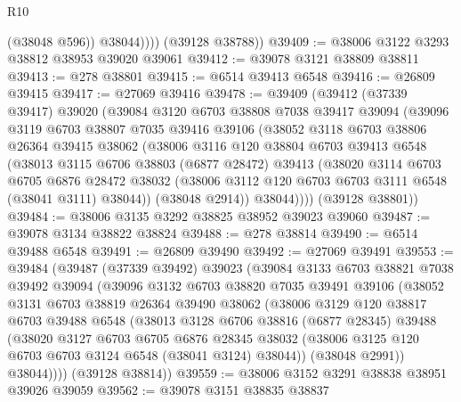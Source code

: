 \begin{lexlean}{R10}
\begin{coremodule}
                (@38048 @596))
              @38044))))
      (@39128 @38788))
@39409 := @38006 @3122 @3293 @38812 @38953 @39020 @39061
@39412 := @39078 @3121 @38809 @38811
@39413 := @278 @38801
@39415 := @6514 @39413 @6548
@39416 := @26809 @39415
@39417 := @27069 @39416
@39478 := @39409
    (@39412
      (@37339 @39417)
      @39020
      (@39084
        @3120
        @6703
        @38808
        @7038
        @39417
        @39094
        (@39096
          @3119
          @6703
          @38807
          @7035
          @39416
          @39106
          (@38052
            @3118
            @6703
            @38806
            @26364
            @39415
            @38062
            (@38006
              @3116
              @120
              @38804
              @6703
              @39413
              @6548
              (@38013
                @3115
                @6706
                @38803
                (@6877 @28472)
                @39413
                (@38020
                  @3114
                  @6703
                  @6705
                  @6876
                  @28472
                  @38032
                  (@38006 @3112 @120 @6703 @6703 @3111 @6548 (@38041 @3111) @38044))
                (@38048 @2914))
              @38044))))
      (@39128 @38801))
@39484 := @38006 @3135 @3292 @38825 @38952 @39023 @39060
@39487 := @39078 @3134 @38822 @38824
@39488 := @278 @38814
@39490 := @6514 @39488 @6548
@39491 := @26809 @39490
@39492 := @27069 @39491
@39553 := @39484
    (@39487
      (@37339 @39492)
      @39023
      (@39084
        @3133
        @6703
        @38821
        @7038
        @39492
        @39094
        (@39096
          @3132
          @6703
          @38820
          @7035
          @39491
          @39106
          (@38052
            @3131
            @6703
            @38819
            @26364
            @39490
            @38062
            (@38006
              @3129
              @120
              @38817
              @6703
              @39488
              @6548
              (@38013
                @3128
                @6706
                @38816
                (@6877 @28345)
                @39488
                (@38020
                  @3127
                  @6703
                  @6705
                  @6876
                  @28345
                  @38032
                  (@38006 @3125 @120 @6703 @6703 @3124 @6548 (@38041 @3124) @38044))
                (@38048 @2991))
              @38044))))
      (@39128 @38814))
@39559 := @38006 @3152 @3291 @38838 @38951 @39026 @39059
@39562 := @39078 @3151 @38835 @38837

\end{coremodule}
\end{lexlean}
